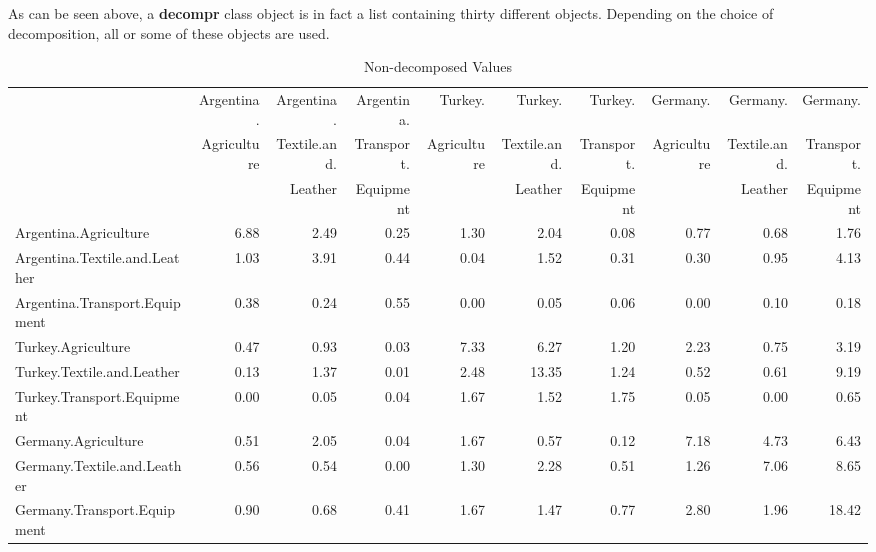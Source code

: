 \documentclass[a4paper]{article}\usepackage[]{graphicx}\usepackage[]{color}
\begin{document}
As can be seen above, a \textbf{decompr} class object is in fact a list containing thirty different objects.
Depending on the choice of decomposition, all or some of these objects are used.

\begin{landscape}
\begin{table}[htbp]
\scriptsize

  \caption{Non-decomposed Values}
  \label{tab:noleon}
  \begin{tabular}{lrrrrrrrrr}
    \hline
         & Argentina. & Argentina. & Argentina. & Turkey. & Turkey. & Turkey. & Germany. & Germany. & Germany.\\
          & Agriculture & Textile.and. & Transport. & Agriculture & Textile.and. & Transport. & Agriculture & Textile.and. & Transport.\\
          & & Leather & Equipment & & Leather & Equipment & & Leather & Equipment\\
    \hline
    Argentina.Agriculture & 6.88  & 2.49  & 0.25  & 1.30  & 2.04  & 0.08  & 0.77  & 0.68  & 1.76 \\
    Argentina.Textile.and.Leather & 1.03  & 3.91  & 0.44  & 0.04  & 1.52  & 0.31  & 0.30  & 0.95  & 4.13 \\
    Argentina.Transport.Equipment & 0.38  & 0.24  & 0.55  & 0.00  & 0.05  & 0.06  & 0.00  & 0.10  & 0.18 \\
    Turkey.Agriculture & 0.47  & 0.93  & 0.03  & 7.33  & 6.27  & 1.20  & 2.23  & 0.75  & 3.19 \\
    Turkey.Textile.and.Leather & 0.13  & 1.37  & 0.01  & 2.48  & 13.35 & 1.24  & 0.52  & 0.61  & 9.19 \\
    Turkey.Transport.Equipment & 0.00  & 0.05  & 0.04  & 1.67  & 1.52  & 1.75  & 0.05  & 0.00  & 0.65 \\
    Germany.Agriculture & 0.51  & 2.05  & 0.04  & 1.67  & 0.57  & 0.12  & 7.18  & 4.73  & 6.43 \\
    Germany.Textile.and.Leather & 0.56  & 0.54  & 0.00  & 1.30  & 2.28  & 0.51  & 1.26  & 7.06  & 8.65 \\
    Germany.Transport.Equipment & 0.90  & 0.68  & 0.41  & 1.67  & 1.47  & 0.77  & 2.80  & 1.96  & 18.42 \\
    \hline
    \end{tabular}

\bigskip \bigskip


\end{table}
\end{landscape}
\end{document}
